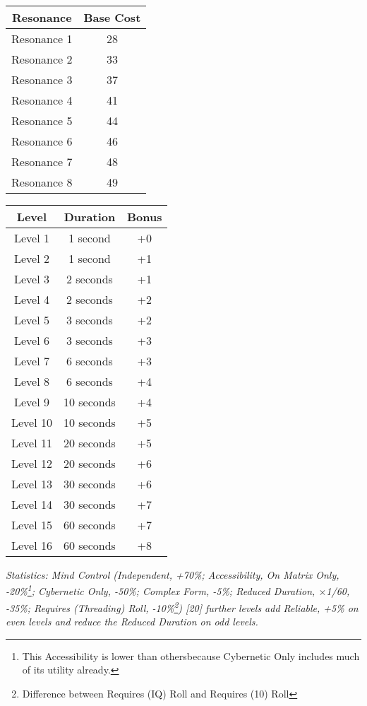 \begin{multicols*}{3}
	\begin{center}
		\begin{tabular}{|c|c|}
			\hline
			Resonance & Base Cost\\
			\hline
			\hline
			Resonance 1 & 28 \\
			Resonance 2 & 33 \\
			Resonance 3 & 37 \\
			Resonance 4 & 41 \\
			Resonance 5 & 44 \\
			Resonance 6 & 46 \\
			Resonance 7 & 48 \\
			Resonance 8 & 49 \\
			\hline
		\end{tabular}
	\end{center}
	
	\begin{center}
		\begin{tabular}{|c|c|c|}
			\hline
			Level & Duration & Bonus\\
			\hline
			\hline
			Level 1 & 1 second & +0 \\
			Level 2 & 1 second & +1 \\
			Level 3 & 2 seconds & +1 \\
			Level 4 & 2 seconds & +2 \\
			Level 5 & 3 seconds & +2 \\
			Level 6 & 3 seconds & +3 \\
			Level 7 & 6 seconds & +3 \\
			Level 8 & 6 seconds & +4 \\
			Level 9 & 10 seconds & +4 \\
			Level 10 & 10 seconds & +5 \\
			Level 11 & 20 seconds & +5 \\
			Level 12 & 20 seconds & +6 \\
			Level 13 & 30 seconds & +6 \\
			Level 14 & 30 seconds & +7 \\
			Level 15 & 60 seconds & +7 \\
			Level 16 & 60 seconds & +8 \\
			\hline
		\end{tabular}
	\end{center}

	\textcolor{OliveGreen}{\textit{Statistics: Mind Control (Independent, +70\%; Accessibility, On Matrix Only, -20\%\footnote{This Accessibility is lower than othersbecause Cybernetic Only includes much of its utility already.}; Cybernetic Only, -50\%; Complex Form, -5\%; Reduced Duration, \(\times\)1/60, -35\%; Requires (Threading) Roll, -10\%\footnote{Difference between Requires (IQ) Roll and Requires (10) Roll}) [20] further levels add Reliable, +5\% on even levels and reduce the Reduced Duration on odd levels. }}
	

\end{multicols*}
